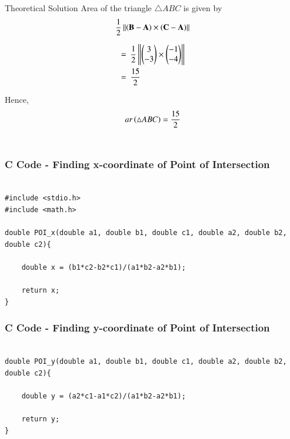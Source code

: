 \documentclass{beamer}
\begin{document}
\begin{frame}{Theoretical Solution}
    Area of the triangle $\triangle ABC$ is given by
\begin{align}
    \frac{1}{2}\left\lVert\left(\mathbf{B-A}\right)\times\left(\mathbf{C-A}\right)\right\rVert
\end{align}

\begin{align}
    =&\ \ \frac{1}{2}\left\lVert\begin{pmatrix}3\\-3\end{pmatrix}\times\begin{pmatrix}-1\\-4\end{pmatrix}\right\rVert\\
    =&\ \ \frac{15}{2}
\end{align}

Hence,
\begin{align}
    ar\left(\triangle ABC\right) = \frac{15}{2}
\end{align}\\

\end{frame}


\begin{frame}[fragile]
    \frametitle{C Code - Finding x-coordinate of Point of Intersection}

    \begin{lstlisting}

#include <stdio.h>
#include <math.h>

double POI_x(double a1, double b1, double c1, double a2, double b2, double c2){
   
    double x = (b1*c2-b2*c1)/(a1*b2-a2*b1);
   
    return x;
}

    \end{lstlisting}

\end{frame}

\begin{frame}[fragile]
    \frametitle{C Code - Finding y-coordinate of Point of Intersection}

    \begin{lstlisting}

double POI_y(double a1, double b1, double c1, double a2, double b2, double c2){
   
    double y = (a2*c1-a1*c2)/(a1*b2-a2*b1);
   
    return y;
}

    \end{lstlisting}

\end{frame}
\end{document}
